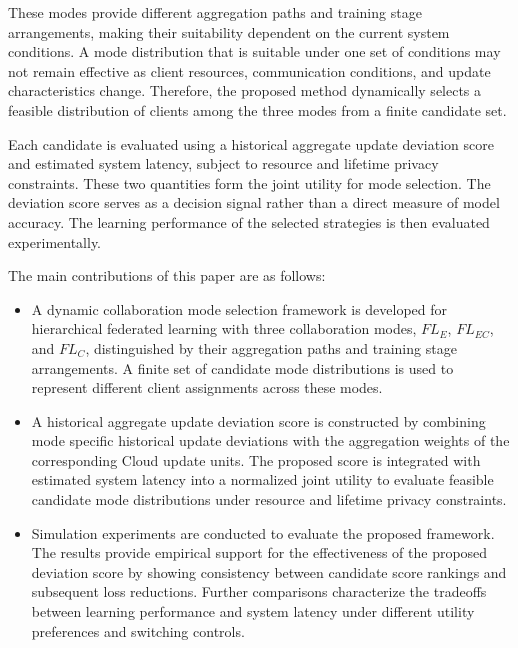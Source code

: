 \documentclass[5p,times]{elsarticle}
\theoremstyle{plain}
\theoremstyle{definition}
\theoremstyle{remark}
\begin{document}
	These modes provide different aggregation paths
	and training stage arrangements, making their
	suitability dependent on the current system
	conditions. A mode distribution that is suitable
	under one set of conditions may not remain
	effective as client resources, communication
	conditions, and update characteristics change.
	Therefore, the proposed method dynamically
	selects a feasible distribution of clients among
	the three modes from a finite candidate set.
	
	Each candidate is evaluated using a historical
	aggregate update deviation score and estimated
	system latency, subject to resource and lifetime
	privacy constraints. These two quantities form
	the joint utility for mode selection. The deviation
	score serves as a decision signal rather than a
	direct measure of model accuracy. The learning
	performance of the selected strategies is then
	evaluated experimentally.
	
	
	The main contributions of this paper are as follows:
	\begin{itemize}
		
		\item A dynamic collaboration mode selection
		framework is developed for hierarchical
		federated learning with three collaboration
		modes, $FL_E$, $FL_{EC}$, and $FL_C$,
		distinguished by their aggregation paths
		and training stage arrangements.
		A finite set of candidate mode distributions
		is used to represent different client
		assignments across these modes.
		
		\item A historical aggregate update deviation
		score is constructed by combining mode
		specific historical update deviations
		with the aggregation weights of the
		corresponding Cloud update units.
		The proposed score is integrated with
		estimated system latency into a normalized
		joint utility to evaluate feasible candidate
		mode distributions under resource and
		lifetime privacy constraints.
		
		\item Simulation experiments are conducted
		to evaluate the proposed framework.
		The results provide empirical support
		for the effectiveness of the proposed
		deviation score by showing consistency
		between candidate score rankings and
		subsequent loss reductions.
		Further comparisons characterize the
		tradeoffs between learning performance
		and system latency under different
		utility preferences and switching controls.
		
	\end{itemize}
	
\end{document}
